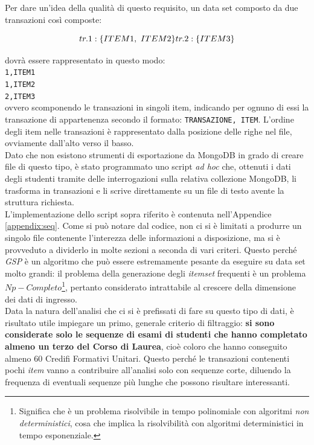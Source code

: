 	Per dare un'idea della qualità di questo requisito, un data set composto da due transazioni così composte: 
	
	\[tr. 1: \{ITEM1,\ ITEM2\} \\
	tr. 2: \{ITEM3\}\]

	\vspace{0.2cm}

	\noindent dovrà essere rappresentato in questo modo: \\

	\noindent\texttt{1,ITEM1}\\
	\texttt{1,ITEM2}\\
	\texttt{2,ITEM3}\\

	\noindent ovvero scomponendo le transazioni in singoli item, indicando per ognuno di essi la transazione di appartenenza secondo il formato: \texttt{TRANSAZIONE, ITEM}. L'ordine degli item nelle transazioni è rappresentato dalla posizione delle righe nel file, ovviamente dall'alto verso il basso. \\

	Dato che non esistono strumenti di esportazione da MongoDB in grado di creare file di questo tipo, è stato programmato uno script \textit{ad hoc} che, ottenuti i dati degli studenti tramite delle interrogazioni sulla relativa collezione MongoDB, li trasforma in transazioni e li scrive direttamente su un file di testo avente la struttura richiesta. \\

	L'implementazione dello script sopra riferito è contenuta nell'Appendice \ref{appendix:seq}. Come si può notare dal codice, non ci si è limitati a produrre un singolo file contenente l'interezza delle informazioni a disposizione, ma si è provveduto a dividerlo in molte sezioni a seconda di vari criteri. Questo perché \textit{GSP} è un algoritmo che può essere estremamente pesante da eseguire su data set molto grandi: il problema della generazione degli \textit{itemset} frequenti è un problema $Np-Completo$\footnote{Significa che è un problema risolvibile in tempo polinomiale con algoritmi \textit{non deterministici}, cosa che implica la risolvibilità con algoritmi deterministici in tempo esponenziale.}, pertanto considerato intrattabile al crescere della dimensione dei dati di ingresso.\\

	Data la natura dell'analisi che ci si è prefissati di fare su questo tipo di dati, è risultato utile impiegare un primo, generale criterio di filtraggio: \textbf{si sono considerate solo le sequenze di esami di studenti che hanno completato almeno un terzo del Corso di Laurea}, cioè coloro che hanno conseguito almeno 60 Credifi Formativi Unitari. Questo perché le transazioni contenenti pochi \textit{item} vanno a contribuire all'analisi solo con sequenze corte, diluendo la frequenza di eventuali sequenze più lunghe che possono risultare interessanti. \\

